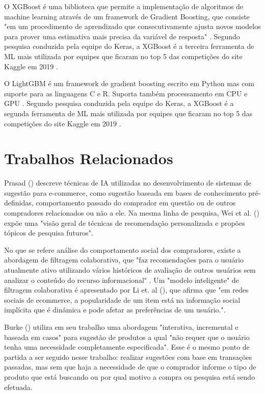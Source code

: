 O XGBoost é uma biblioteca que permite a implementação de algoritmos de machine learning através de um framework de Gradient Boosting, que consiste "em um procedimento de aprendizado que consecutivamente ajusta novos modelos para prover uma estimativa mais precisa da variável de resposta" \cite{natekin13}. Segundo pesquisa conduzida pela equipe do Keras, a XGBoost é a terceira ferramenta de ML mais utilizada por equipes que ficaram no top 5 das competições do site Kaggle em 2019 \cite{keras202}.

O LightGBM é um framework de gradient boosting escrito em Python mas com suporte para as linguagens C e R. Suporta também processamento em CPU e GPU \cite{lgbm20}. Segundo pesquisa conduzida pela equipe do Keras, a XGBoost é a segunda ferramenta de ML mais utilizada por equipes que ficaram no top 5 das competições do site Kaggle em 2019 \cite{keras202}.

\section{Trabalhos Relacionados}
\label{trab-relacionados} 
Prasad (\citeyear{prasad03}) descreve técnicas de IA utilizadas no desenvolvimento de sistemas de sugestão para e-commerce, como sugestão baseada em bases de conhecimento pré-definidas, comportamento passado do comprador em questão ou de outros compradores relacionados ou não a ele. Na mesma linha de pesquisa, Wei et al. (\citeyear{wei07}) expõe uma "visão geral de técnicas de recomendação personalizada e propões tópicos de pesquisa futuros".

No que se refere análise do comportamento social dos compradores, existe a abordagem de filtragem colaborativa, que "faz recomendações para o usuário atualmente ativo utilizando vários históricos de avaliação de outros usuários sem analizar o conteúdo do recurso informacional" \cite{chen18}. Um "modelo inteligente" de filtragem colaborativa é apresentado por Li et. al (\citeyear{li19}), que afirma que "em redes sociais de ecommerce, a popularidade de um item está na informação social implícita que é dinâmica e pode afetar as preferências de um usuário.".

Burke (\citeyear{burke02}) utiliza em seu trabalho uma abordagem "interativa, incremental e baseada em casos" para sugestão de produtos a qual "não requer que o usuário tenha uma necessidade completamente especificada". Esse é o mesmo ponto de partida a ser seguido nesse trabalho: realizar sugestões com base em transações passadas, mas sem que haja a necessidade de que o comprador informe o tipo de produto que está buscando ou por qual motivo a compra ou pesquisa está sendo efetuada.

